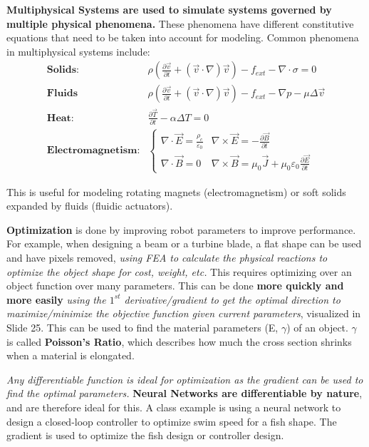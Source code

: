 \documentclass[onecolumn,a4paper]{article}
\begin{document}
\textbf{Multiphysical Systems are used to simulate systems governed by multiple physical phenomena.} These phenomena have different constitutive equations that need to be taken into account for modeling. Common phenomena in multiphysical systems include:
\begin{equation}
    \begin{array}{cc}
        \textbf{Solids:} & \rho(\frac{\partial \Vec{v}}{\partial t} + (\Vec{v}\cdot\nabla)\Vec{v})-f_{ext} - \nabla\cdot\sigma = 0 \\
        \textbf{Fluids} & \rho(\frac{\partial \Vec{v}}{\partial t} + (\Vec{v}\cdot\nabla)\Vec{v})-f_{ext} - \nabla p - \mu\Delta\Vec{v} \\
        \textbf{Heat:} & \frac{\partial\Vec{T}}{\partial t} - \alpha\Delta T = 0 \\
        \textbf{Electromagnetism:} & \left\{\begin{array}{cc}
            \nabla \cdot\Vec{E} = \frac{\rho_c}{\varepsilon_0} & \nabla \times \Vec{E} = -\frac{\partial\Vec{B}}{\partial t} \\
            \nabla \cdot \Vec{B} = 0 & \nabla \times \Vec{B} = \mu_0 \Vec{J} + \mu_0\varepsilon_0\frac{\partial\Vec{E}}{\partial t} 
        \end{array} \right.
    \end{array}
\end{equation}

This is useful for modeling rotating magnets (electromagnetism) or soft solids expanded by fluids (fluidic actuators).

\textbf{Optimization} is done by improving robot parameters to improve performance. For example, when designing a beam or a turbine blade, a flat shape can be used and have pixels removed, \emph{using FEA to  calculate the physical reactions to optimize the object shape for cost, weight, etc.} This requires optimizing over an object function over many parameters. This can be done \textbf{more quickly and more easily} \emph{using the $1^{st}$ derivative/gradient to get the optimal direction to maximize/minimize the objective function given current parameters}, visualized in Slide 25. This can be used to find the material parameters (E, $\gamma$) of an object. $\gamma$ is called \textbf{Poisson's Ratio}, which describes how much the cross section shrinks when a material is elongated.

\emph{Any differentiable function is ideal for optimization as the gradient can be used to find the optimal parameters.} \textbf{Neural Networks are differentiable by nature}, and are therefore ideal for this. A class example is using a neural network to design a closed-loop controller to optimize swim speed for a fish shape. The gradient is used to optimize the fish design or controller design.
\end{document}
